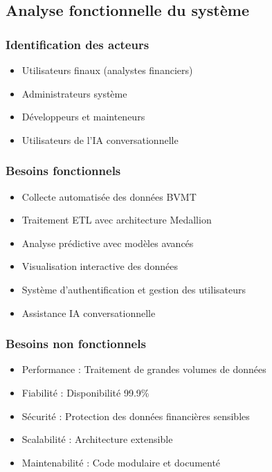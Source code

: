 \documentclass[12pt,a4paper]{article}
\begin{document}
\subsection{Analyse fonctionnelle du système}
\subsubsection{Identification des acteurs}
\begin{itemize}
    \item Utilisateurs finaux (analystes financiers)
    \item Administrateurs système
    \item Développeurs et mainteneurs
    \item Utilisateurs de l'IA conversationnelle
\end{itemize}

\subsubsection{Besoins fonctionnels}
\begin{itemize}
    \item Collecte automatisée des données BVMT
    \item Traitement ETL avec architecture Medallion
    \item Analyse prédictive avec modèles avancés
    \item Visualisation interactive des données
    \item Système d'authentification et gestion des utilisateurs
    \item Assistance IA conversationnelle
\end{itemize}

\subsubsection{Besoins non fonctionnels}
\begin{itemize}
    \item Performance : Traitement de grandes volumes de données
    \item Fiabilité : Disponibilité 99.9\%
    \item Sécurité : Protection des données financières sensibles
    \item Scalabilité : Architecture extensible
    \item Maintenabilité : Code modulaire et documenté
\end{itemize}
\end{document}
